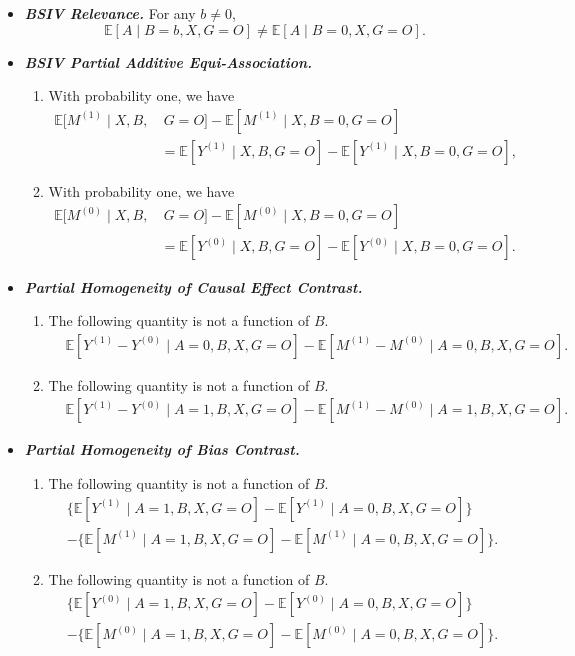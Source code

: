\documentclass[10pt]{article}
\newcommand{\E}{\mathbb{E}}
\begin{document}
\begin{itemize}
\item {\bf \emph{BSIV Relevance.}} For any $b\neq 0$,
\[
\E[A\mid B=b,X,G=O]\neq \E[A\mid B=0,X,G=O].
\]	

\item {\bf \emph{BSIV Partial Additive Equi-Association.}} 
\begin{enumerate}[label=(\roman*)]
\item With probability one, we have
\begin{align*}
\E[M^{(1)}\mid  X,B,&~G=O]-\E[M^{(1)}\mid  X,B=0,G=O]\\
&=\E[Y^{(1)}\mid  X,B,G=O]-\E[Y^{(1)}\mid  X,B=0,G=O],
\end{align*}
\item With probability one, we have
\begin{align*}
\E[M^{(0)}\mid X,B,&~G=O]-\E[M^{(0)}\mid  X,B=0,G=O]\\
&=\E[Y^{(0)}\mid  X,B,G=O]-\E[Y^{(0)}\mid  X,B=0,G=O].
\end{align*}	
\end{enumerate}

\item {\bf \emph{Partial Homogeneity of Causal Effect Contrast.}}
\begin{enumerate}[label=(\roman*)]
\item The following quantity is not a function of $B$.
\begin{align*}
&\E[Y^{(1)}-Y^{(0)}\mid A=0,B,X,G=O]-\E[M^{(1)}-M^{(0)}\mid A=0,B,X,G=O].
\end{align*}
\item The following quantity is not a function of $B$.
\begin{align*}
&\E[Y^{(1)}-Y^{(0)}\mid A=1,B,X,G=O]-\E[M^{(1)}-M^{(0)}\mid A=1,B,X,G=O].
\end{align*}
\end{enumerate}


\item {\bf \emph{Partial Homogeneity of Bias Contrast.}}
\begin{enumerate}[label=(\roman*)]
\item The following quantity is not a function of $B$.
\begin{align*}
&\big\{\E[Y^{(1)}\mid A=1,B,X,G=O]-\E[Y^{(1)}\mid A=0,B,X,G=O]\big\}\\
&-\big\{\E[M^{(1)}\mid A=1,B,X,G=O]-\E[M^{(1)}\mid A=0,B,X,G=O]\big\}.
\end{align*}
\item The following quantity is not a function of $B$.
\begin{align*}
&\big\{\E[Y^{(0)}\mid A=1,B,X,G=O]-\E[Y^{(0)}\mid A=0,B,X,G=O]\big\}\\
&-\big\{\E[M^{(0)}\mid A=1,B,X,G=O]-\E[M^{(0)}\mid A=0,B,X,G=O]\big\}.
\end{align*}
\end{enumerate}

\end{itemize}
\end{document}
